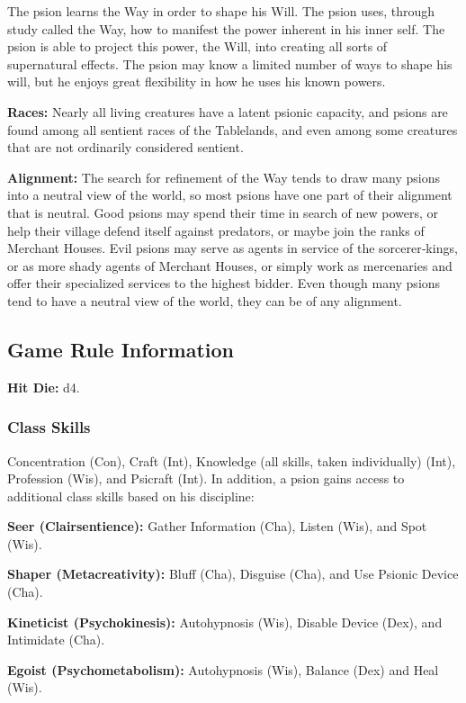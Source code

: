 The psion learns the Way in order to shape his Will. The psion uses, through study called the Way, how to manifest the power inherent in his inner self. The psion is able to project this power, the Will, into creating all sorts of supernatural effects. The psion may know a limited number of ways to shape his will, but he enjoys great flexibility in how he uses his known powers.

\textbf{Races:} Nearly all living creatures have a latent psionic capacity, and psions are found among all sentient races of the Tablelands, and even among some creatures that are not ordinarily considered sentient.

\textbf{Alignment:} The search for refinement of the Way tends to draw many psions into a neutral view of the world, so most psions have one part of their alignment that is neutral. Good psions may spend their time in search of new powers, or help their village defend itself against predators, or maybe join the ranks of Merchant Houses. Evil psions may serve as agents in service of the sorcerer‐kings, or as more shady agents of Merchant Houses, or simply work as mercenaries and offer their specialized services to the highest bidder. Even though many psions tend to have a neutral view of the world, they can be of any alignment.

\subsection{Game Rule Information}

\textbf{Hit Die:} d4.

\subsubsection{Class Skills}

Concentration (Con), Craft (Int), Knowledge (all skills, taken individually) (Int), Profession (Wis), and Psicraft (Int). In addition, a psion gains access to additional class skills based on his discipline:

\textbf{Seer (Clairsentience):} Gather Information (Cha), Listen (Wis), and Spot (Wis).

\textbf{Shaper (Metacreativity):} Bluff (Cha), Disguise (Cha), and Use Psionic Device (Cha).

\textbf{Kineticist (Psychokinesis):} Autohypnosis (Wis), Disable Device (Dex), and Intimidate (Cha).

\textbf{Egoist (Psychometabolism):} Autohypnosis (Wis), Balance (Dex) and Heal (Wis).

